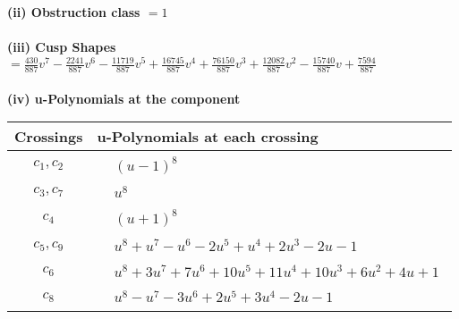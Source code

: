 \documentclass[1p]{elsarticle_modified}
\theoremstyle{definition}
\begin{document}
\flushleft \textbf{(ii) Obstruction class $= 1$}\\~\\
\flushleft \textbf{(iii) Cusp Shapes $= \frac{430}{887} v^7-\frac{2241}{887} v^6-\frac{11719}{887} v^5+\frac{16745}{887} v^4+\frac{76150}{887} v^3+\frac{12082}{887} v^2-\frac{15740}{887} v+\frac{7594}{887}$}\\~\\
\newpage\renewcommand{\arraystretch}{1}
\flushleft \textbf{(iv) u-Polynomials at the component}\newline \\
\begin{tabular}{m{50pt}|m{274pt}}
Crossings & \hspace{64pt}u-Polynomials at each crossing \\
\hline $$\begin{aligned}c_{1},c_{2}\end{aligned}$$&$\begin{aligned}
&(u-1)^8
\end{aligned}$\\
\hline $$\begin{aligned}c_{3},c_{7}\end{aligned}$$&$\begin{aligned}
&u^8
\end{aligned}$\\
\hline $$\begin{aligned}c_{4}\end{aligned}$$&$\begin{aligned}
&(u+1)^8
\end{aligned}$\\
\hline $$\begin{aligned}c_{5},c_{9}\end{aligned}$$&$\begin{aligned}
&u^8+u^7- u^6-2 u^5+u^4+2 u^3-2 u-1
\end{aligned}$\\
\hline $$\begin{aligned}c_{6}\end{aligned}$$&$\begin{aligned}
&u^8+3 u^7+7 u^6+10 u^5+11 u^4+10 u^3+6 u^2+4 u+1
\end{aligned}$\\
\hline $$\begin{aligned}c_{8}\end{aligned}$$&$\begin{aligned}
&u^8- u^7-3 u^6+2 u^5+3 u^4-2 u-1
\end{aligned}$\\

\end{tabular}
\end{document}
